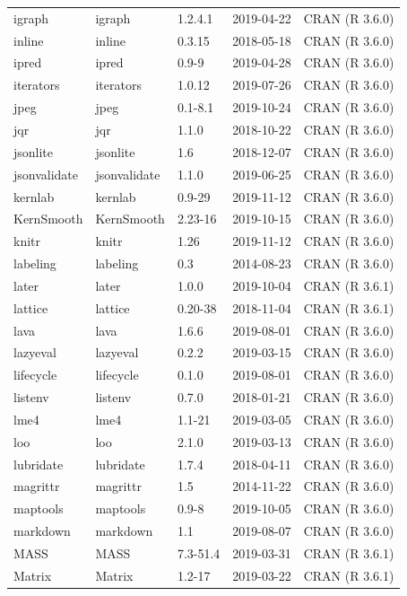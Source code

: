 \documentclass[]{article}
\begin{document}
\begin{longtable}[t]{lllll}
igraph & igraph & 1.2.4.1 & 2019-04-22 & CRAN (R 3.6.0)\\
inline & inline & 0.3.15 & 2018-05-18 & CRAN (R 3.6.0)\\
ipred & ipred & 0.9-9 & 2019-04-28 & CRAN (R 3.6.0)\\
\addlinespace
iterators & iterators & 1.0.12 & 2019-07-26 & CRAN (R 3.6.0)\\
jpeg & jpeg & 0.1-8.1 & 2019-10-24 & CRAN (R 3.6.0)\\
jqr & jqr & 1.1.0 & 2018-10-22 & CRAN (R 3.6.0)\\
jsonlite & jsonlite & 1.6 & 2018-12-07 & CRAN (R 3.6.0)\\
jsonvalidate & jsonvalidate & 1.1.0 & 2019-06-25 & CRAN (R 3.6.0)\\
\addlinespace
kernlab & kernlab & 0.9-29 & 2019-11-12 & CRAN (R 3.6.0)\\
KernSmooth & KernSmooth & 2.23-16 & 2019-10-15 & CRAN (R 3.6.0)\\
knitr & knitr & 1.26 & 2019-11-12 & CRAN (R 3.6.0)\\
labeling & labeling & 0.3 & 2014-08-23 & CRAN (R 3.6.0)\\
later & later & 1.0.0 & 2019-10-04 & CRAN (R 3.6.1)\\
\addlinespace
lattice & lattice & 0.20-38 & 2018-11-04 & CRAN (R 3.6.1)\\
lava & lava & 1.6.6 & 2019-08-01 & CRAN (R 3.6.0)\\
lazyeval & lazyeval & 0.2.2 & 2019-03-15 & CRAN (R 3.6.0)\\
lifecycle & lifecycle & 0.1.0 & 2019-08-01 & CRAN (R 3.6.0)\\
listenv & listenv & 0.7.0 & 2018-01-21 & CRAN (R 3.6.0)\\
\addlinespace
lme4 & lme4 & 1.1-21 & 2019-03-05 & CRAN (R 3.6.0)\\
loo & loo & 2.1.0 & 2019-03-13 & CRAN (R 3.6.0)\\
lubridate & lubridate & 1.7.4 & 2018-04-11 & CRAN (R 3.6.0)\\
magrittr & magrittr & 1.5 & 2014-11-22 & CRAN (R 3.6.0)\\
maptools & maptools & 0.9-8 & 2019-10-05 & CRAN (R 3.6.0)\\
\addlinespace
markdown & markdown & 1.1 & 2019-08-07 & CRAN (R 3.6.0)\\
MASS & MASS & 7.3-51.4 & 2019-03-31 & CRAN (R 3.6.1)\\
Matrix & Matrix & 1.2-17 & 2019-03-22 & CRAN (R 3.6.1)\\

\end{longtable}
\end{document}
